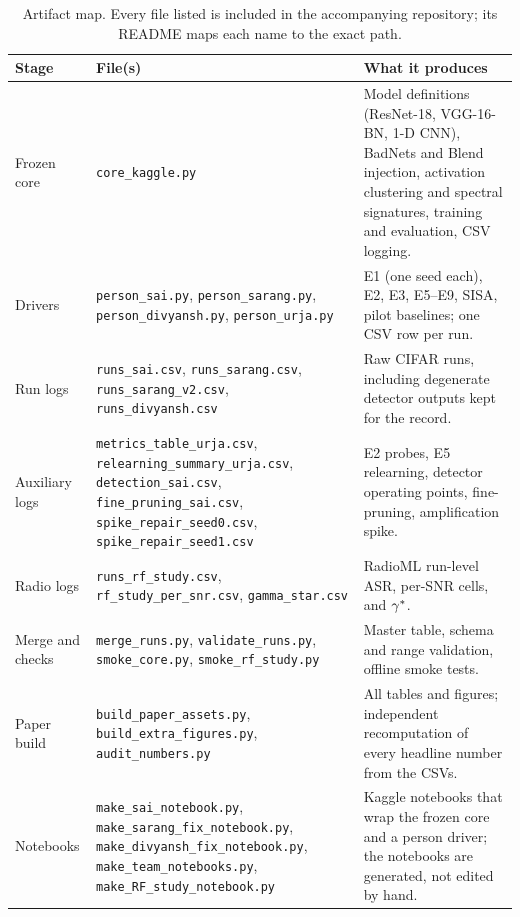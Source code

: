\begin{table}[t]
\centering
\caption{Artifact map. Every file listed is included in the accompanying
repository; its README maps each name to the exact path.}
\label{tab:artifact}
\footnotesize
\setlength{\tabcolsep}{4pt}
\begin{tabular}{@{}p{}p{}p{}@{}}
\toprule
\textbf{Stage} & \textbf{File(s)} & \textbf{What it produces} \\
\midrule
Frozen core & \texttt{core\_kaggle.py} & Model definitions (ResNet-18, VGG-16-BN, 1-D CNN), BadNets and Blend injection, activation clustering and spectral signatures, training and evaluation, CSV logging. \\
Drivers & \texttt{person\_sai.py}, \texttt{person\_sarang.py}, \texttt{person\_divyansh.py}, \texttt{person\_urja.py} & E1 (one seed each), E2, E3, E5--E9, SISA, pilot baselines; one CSV row per run. \\
Run logs & \texttt{runs\_sai.csv}, \texttt{runs\_sarang.csv}, \texttt{runs\_sarang\_v2.csv}, \texttt{runs\_divyansh.csv} & Raw CIFAR runs, including degenerate detector outputs kept for the record. \\
Auxiliary logs & \texttt{metrics\_table\_urja.csv}, \texttt{relearning\_summary\_urja.csv}, \texttt{detection\_sai.csv}, \texttt{fine\_pruning\_sai.csv}, \texttt{spike\_repair\_seed0.csv}, \texttt{spike\_repair\_seed1.csv} & E2 probes, E5 relearning, detector operating points, fine-pruning, amplification spike. \\
Radio logs & \texttt{runs\_rf\_study.csv}, \texttt{rf\_study\_per\_snr.csv}, \texttt{gamma\_star.csv} & RadioML run-level ASR, per-SNR cells, and $\gamma^{\ast}$. \\
Merge and checks & \texttt{merge\_runs.py}, \texttt{validate\_runs.py}, \texttt{smoke\_core.py}, \texttt{smoke\_rf\_study.py} & Master table, schema and range validation, offline smoke tests. \\
Paper build & \texttt{build\_paper\_assets.py}, \texttt{build\_extra\_figures.py}, \texttt{audit\_numbers.py} & All tables and figures; independent recomputation of every headline number from the CSVs. \\
Notebooks & \texttt{make\_sai\_notebook.py}, \texttt{make\_sarang\_fix\_notebook.py}, \texttt{make\_divyansh\_fix\_notebook.py}, \texttt{make\_team\_notebooks.py}, \texttt{make\_RF\_study\_notebook.py} & Kaggle notebooks that wrap the frozen core and a person driver; the notebooks are generated, not edited by hand. \\
\bottomrule
\end{tabular}
\end{table}

